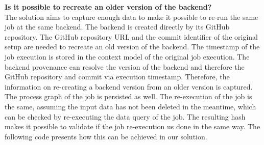 \documentclass[draft,final]{vutinfth} %
\begin{document}
\textbf{Is it possible to recreate an older version of the backend?} \\
The solution aims to capture enough data to make it possible to re-run the same job at the same backend. The backend is created directly by its GitHub repository. The GitHub repository URL and the commit identifier of the original setup are needed to recreate an old version of the backend. The timestamp of the job execution is stored in the context model of the original job execution. The backend provenance can resolve the version of the backend and therefore the GitHub repository and commit via execution timestamp. Therefore, the information on re-creating a backend version from an older version is captured. The process graph of the job is persisted as well. The re-execution of the job is the same, assuming the input data has not been deleted in the meantime, which can be checked by re-executing the data query of the job. The resulting hash makes it possible to validate if the job re-execution us done in the same way. The following code presents how this can be achieved in our solution.
\newpage
\end{document}
